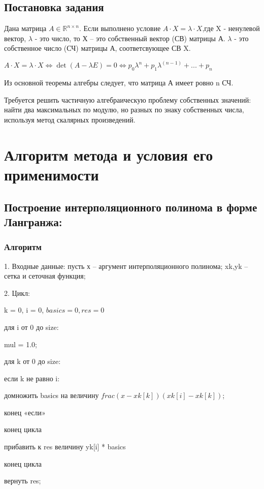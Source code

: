 \documentclass{article}
\begin{document}
	\subsection{Постановка задания}
	Дана матрица $A \in \mathbb{R}^{n \times n}$. Если выполнено условие $A \cdot X = \lambda \cdot X$,где X - ненулевой вектор, $\lambda$ - это  число, то Х – это собственный вектор (СВ) матрицы А. $\lambda$ - это собственное число (СЧ) матрицы А, соответсвующее СВ X.
	
	$A \cdot X = \lambda \cdot X \Leftrightarrow \det(A-\lambda E) = 0 \Leftrightarrow p_0\lambda^n + p_1\lambda^{(n-1)}+...+p_n$
	
	Из основной теоремы алгебры следует, что матрица А имеет ровно n СЧ.
	
	Требуется решить частичную алгебраическую проблему собственных значений: найти два максимальных по модулю, но разных по знаку собственных числа, используя метод скалярных произведений.
	
	
	\section{Алгоритм метода и условия его применимости}   
	
	\subsection{Построение интерполяционного полинома в форме Лангранжа:}
	\subsubsection{Алгоритм}
	1. Входные данные: пусть х – аргумент интерполяционного полинома; xk,yk – сетка и сеточная функция;  
	
	2. Цикл:
	
	k = 0, i = 0, $basics = 0, res = 0$
	
	для i от 0 до size: 
	
	mul = 1.0;
	
		для k от 0 до size:
		
			если k не равно i:
				
				домножить basics на величину $frac{(x - xk[k])}{(xk[i]-xk[k])}$;
			
			конец «если»
		
		конец цикла
		
		прибавить к res величину yk[i] * basics
	
	конец цикла
	
	вернуть res;
\end{document}
